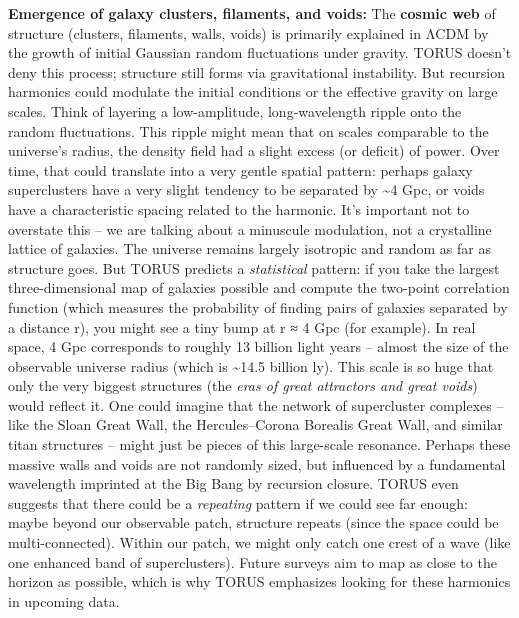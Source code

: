 \documentclass[
]{article}
\begin{document}
\textbf{Emergence of galaxy clusters, filaments, and voids:} The
\textbf{cosmic web} of structure (clusters, filaments, walls, voids) is
primarily explained in ΛCDM by the growth of initial Gaussian random
fluctuations under gravity. TORUS doesn't deny this process; structure
still forms via gravitational instability. But recursion harmonics could
modulate the initial conditions or the effective gravity on large
scales. Think of layering a low-amplitude, long-wavelength ripple onto
the random fluctuations. This ripple might mean that on scales
comparable to the universe's radius, the density field had a slight
excess (or deficit) of power. Over time, that could translate into a
very gentle spatial pattern: perhaps galaxy superclusters have a very
slight tendency to be separated by \textasciitilde4 Gpc, or voids have a
characteristic spacing related to the harmonic. It's important not to
overstate this -- we are talking about a minuscule modulation, not a
crystalline lattice of galaxies. The universe remains largely isotropic
and random as far as structure goes. But TORUS predicts a
\emph{statistical} pattern: if you take the largest three-dimensional
map of galaxies possible and compute the two-point correlation function
(which measures the probability of finding pairs of galaxies separated
by a distance r), you might see a tiny bump at r ≈ 4 Gpc (for
example)\hspace{0pt}. In real space, 4 Gpc corresponds to roughly 13
billion light years -- almost the size of the observable universe radius
(which is \textasciitilde14.5 billion ly). This scale is so huge that
only the very biggest structures (the \emph{eras of great attractors and
great voids}) would reflect it. One could imagine that the network of
supercluster complexes -- like the Sloan Great Wall, the
Hercules--Corona Borealis Great Wall, and similar titan structures --
might just be pieces of this large-scale resonance. Perhaps these
massive walls and voids are not randomly sized, but influenced by a
fundamental wavelength imprinted at the Big Bang by recursion closure.
TORUS even suggests that there could be a \emph{repeating} pattern if we
could see far enough: maybe beyond our observable patch, structure
repeats (since the space could be multi-connected). Within our patch, we
might only catch one crest of a wave (like one enhanced band of
superclusters). Future surveys aim to map as close to the horizon as
possible, which is why TORUS emphasizes looking for these harmonics in
upcoming data\hspace{0pt}.
\end{document}
